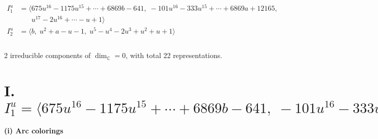 \documentclass[1p]{elsarticle_modified}
\theoremstyle{definition}
\begin{document}
\begin{align*}
I^u_{1}&=\langle 
675 u^{16}-1175 u^{15}+\cdots+6869 b-641,\;-101 u^{16}-333 u^{15}+\cdots+6869 a+12165,\\
\phantom{I^u_{1}}&\phantom{= \langle  }u^{17}-2 u^{16}+\cdots- u+1\rangle \\
I^u_{2}&=\langle 
b,\;u^2+a- u-1,\;u^5- u^4-2 u^3+u^2+u+1\rangle \\
\\
\end{align*}
\raggedright * 2 irreducible components of $\dim_{\mathbb{C}}=0$, with total 22 representations.\\
\newpage
\renewcommand{\arraystretch}{1}
\centering \section*{I. $I^u_{1}= \langle 675 u^{16}-1175 u^{15}+\cdots+6869 b-641,\;-101 u^{16}-333 u^{15}+\cdots+6869 a+12165,\;u^{17}-2 u^{16}+\cdots- u+1 \rangle$}
\flushleft \textbf{(i) Arc colorings}\\
\end{document}
